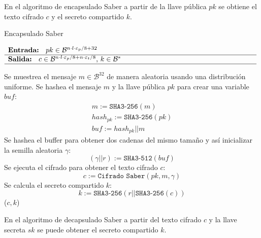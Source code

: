 En el algoritmo de encapsulado Saber a partir de la llave pública \(pk\) se obtiene el texto cifrado \(c\) y el secreto compartido \(k\). 
\begin{algorithm}[H]
	\small 
	\caption{Encapsulado Saber}
	$\begin{array}{p{\textwidth}}
		\textbf{Entrada: } \(pk\in \mathcal{B}^{n\cdot l \cdot \varepsilon_p/8+32}\)\\ 
		\hline
		\textbf{Salida: } \(c\in \mathcal{B}^{n\cdot l\cdot \varepsilon_p/8+n\cdot \varepsilon_t/8}\), \(k\in \mathcal{B}^{*}\)\\ 
		\hline
	\end{array}$
	\begin{algorithmic}[1]
		\State Se muestrea el mensaje \(m\in \mathcal{B}^{32}\) de manera aleatoria usando una distribución uniforme.
		\State Se hashea el mensaje \(m\) y la llave pública \(pk\) para crear una variable \(buf\):
		\begin{equation}
			\begin{array}{l}
				m:=\texttt{SHA3-256}(m)\\
				hash_{pk}:=\texttt{SHA3-256}(pk)\\
				buf:=hash_{pk}||m
			\end{array}
		\end{equation}
		\State Se hashea el buffer para obtener dos cadenas del mismo tamaño y así inicializar la semilla aleatoria $\gamma$:
		\begin{equation}
			(\gamma||r):=\texttt{SHA3-512}(buf)
		\end{equation}
		\State Se ejecuta el cifrado para obtener el texto cifrado \(c\):
		\begin{equation}
			c:=\texttt{Cifrado Saber}(pk,m,\gamma)
		\end{equation}
		\State Se calcula el secreto compartido \(k\):
		\begin{equation}
			k:=\texttt{SHA3-256}(r||\texttt{SHA3-256}(c))
		\end{equation}
		\State \Return (\(c,k\))
	\end{algorithmic}
\end{algorithm}
\newpage
En el algoritmo de decapsulado Saber a partir del texto cifrado \(c\) y la llave secreta \(sk\) se puede obtener el secreto compartido \(k\).
